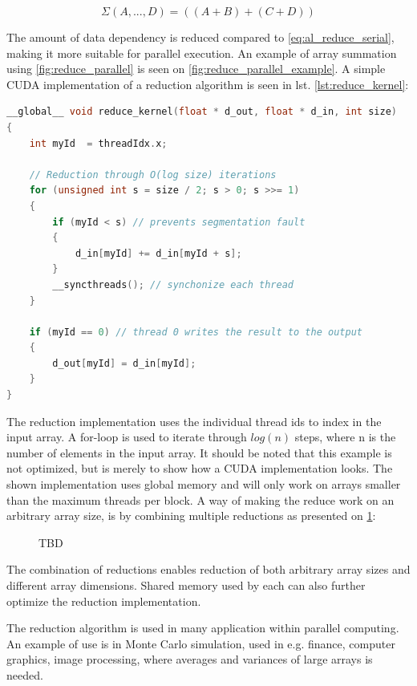 \begin{equation}
\label{eq:al_reduce_parallel}
\Sigma(A,...,D) = ((A+B)+(C+D))
\end{equation}

The amount of data dependency is reduced compared to \cref{eq:al_reduce_serial}, making it more suitable for parallel execution. An example of array summation using \cref{fig:reduce_parallel} is seen on \cref{fig:reduce_parallel_example}. A simple CUDA implementation of a reduction algorithm is seen in lst. \ref{lst:reduce_kernel}:

\begin{lstlisting}[language=C,caption={TBD},label=lst:reduce_kernel]
__global__ void reduce_kernel(float * d_out, float * d_in, int size)
{
	int myId  = threadIdx.x; 

	// Reduction through O(log size) iterations
	for (unsigned int s = size / 2; s > 0; s >>= 1)
	{
		if (myId < s) // prevents segmentation fault
		{
			d_in[myId] += d_in[myId + s];
		}
		__syncthreads(); // synchonize each thread        
	}

	if (myId == 0) // thread 0 writes the result to the output
	{
		d_out[myId] = d_in[myId];
	}
}
\end{lstlisting}

The reduction implementation uses the individual thread ids to index in the input array. A for-loop is used to iterate through  $log(n)$ steps, where n is the number of elements in the input array. It should be noted that this example is not optimized, but is merely to show how a CUDA implementation looks. The shown implementation uses global memory and will only work on arrays smaller than the maximum threads per block. A way of making the reduce work on an arbitrary array size, is by combining multiple reductions as presented on \cref{fig:al_reduce_combine}:

\begin{figure}[ht]
	\centering
	\caption{TBD}
	\label{fig:al_reduce_combine}
\end{figure}

The combination of reductions enables reduction of both arbitrary array sizes and different array dimensions. Shared memory used by each  can also further optimize the reduction implementation.

The reduction algorithm is used in many application within parallel computing. An example of use is in Monte Carlo simulation, used in e.g. finance, computer graphics, image processing, where averages and variances of large arrays is needed.
